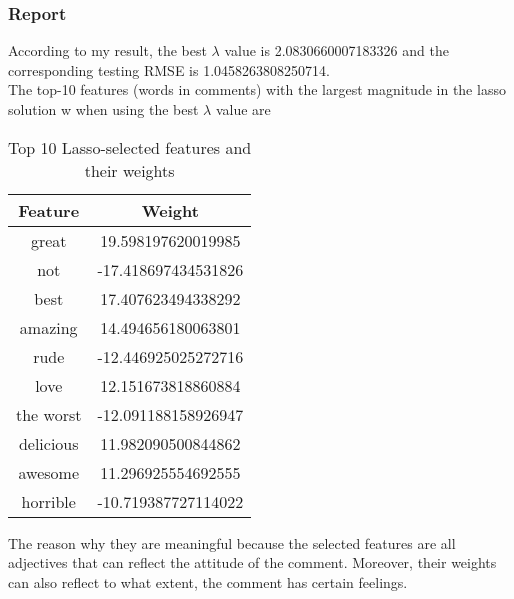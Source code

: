 \documentclass{article}
\begin{document}
\subsubsection*{Report}
According to my result, the best $\lambda$ value is 2.0830660007183326 and the corresponding testing RMSE is 1.0458263808250714.\\
The top-10 features (words in comments) with the largest magnitude in the lasso solution w when using the best $\lambda$ value are
\begin{table}[h!]
    \centering
    \begin{tabular}{|c|c|}
    \hline
    \textbf{Feature} & \textbf{Weight} \\
    \hline
    great     & 19.598197620019985 \\
    not       & -17.418697434531826 \\
    best      & 17.407623494338292 \\
    amazing   & 14.494656180063801 \\
    rude      & -12.446925025272716 \\
    love      & 12.151673818860884 \\
    the worst & -12.091188158926947 \\
    delicious & 11.982090500844862 \\
    awesome   & 11.296925554692555 \\
    horrible  & -10.719387727114022 \\
    \hline
    \end{tabular}
    \caption{Top 10 Lasso-selected features and their weights}
    \end{table}
The reason why they are meaningful because the selected features are all adjectives that can reflect the attitude of the comment. Moreover, their weights can also reflect to what extent, the comment has certain feelings.
\end{document}
